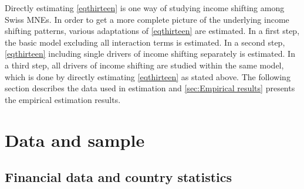\documentclass[10pt,twocolumn,oneside,cmyk]{article}
\begin{document}
Directly estimating \cref{eqthirteen} is one way of studying income shifting among Swiss MNEs. In order to get a more complete picture of the underlying income shifting patterns, various adaptations of \cref{eqthirteen} are estimated. In a first step, the basic model excluding all interaction terms is estimated. In a second step, \cref{eqthirteen} including single drivers of income shifting separately is estimated. In a third step, all drivers of income shifting are studied within the same model, which is done by directly estimating \cref{eqthirteen} as stated above. The following section describes the data used in estimation and \cref{sec:Empirical results} presents the empirical estimation results.

\section{Data and sample} \label{sec:Data and sample}
\subsection{Financial data and country statistics} \label{sec:5.1}
\end{document}
